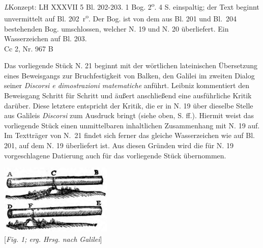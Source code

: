 \begin{Ueberlieferung}%
{\textit{L}}Konzept: LH XXXVII 5 Bl. 202-203. 1 Bog. 2\textsuperscript{o}. 4 S. einspaltig;
der Text beginnt unver\-mittelt auf Bl. 202~r\textsuperscript{o}.
Der Bog. ist von dem aus Bl. 201 und Bl.~204 bestehenden Bog. um\-schlossen,
welcher N. 19 %
und N. 20 %
überliefert.
Ein Wasserzeichen auf Bl. 203.\\
Cc 2, Nr. 967 B 
\end{Ueberlieferung}
\vspace{5mm}
\begin{Datierungsgruende}%
Das vorliegende Stück N. 21 %
beginnt mit der wörtlichen lateinischen Übersetzung eines Beweisgangs zur Bruchfestigkeit von Balken, den Galilei\protect{} im zweiten Dialog seiner \textit{Discorsi e dimostrazioni matematiche} anführt.
Leibniz kommentiert den Beweisgang Schritt für Schritt und äußert anschließend eine ausführliche Kritik darüber.
Diese letztere entspricht der Kritik, die er in N. 19 %
über dieselbe Stelle aus Galileis \textit{Discorsi} zum Ausdruck bringt (siehe oben, S. \pageref{037,05_201}ff.). 
Hiermit weist das vorliegende Stück einen unmittelbaren inhalt\-lichen Zusammenhang mit N. 19 %
auf. Im Textträger von N.~21 %
findet sich ferner das gleiche Wasserzeichen wie auf Bl. 201,
auf dem N. 19 %
überliefert ist.
Aus diesen Gründen wird die für N. 19 %
vorgeschlagene Datierung auch für das vorliegende Stück übernommen. 
\end{Datierungsgruende}
%
\vspace{1em}%
\pstart%
\centering\includegraphics[width=0.4\textwidth]{images/Galilei_Opere_1556_Ausschn.pdf}\\
\centering{}[\textit{Fig. 1; erg. Hrsg. nach Galilei}]
